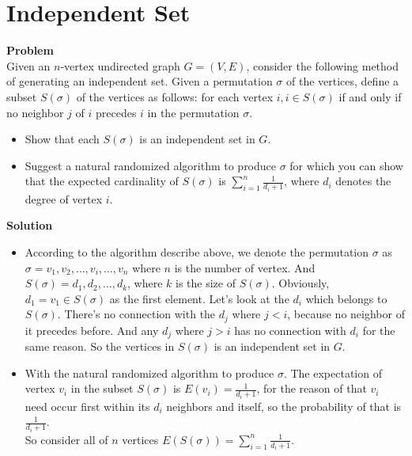 	\section{Independent Set}
	\textbf{Problem}\\
	Given an $n$-vertex undirected graph $G = (V, E)$, consider the following method of generating an independent set. Given a permutation $\sigma$ of the vertices, define a subset $S(\sigma)$ of the vertices as follows: for each vertex $i, i \in S(\sigma)$ if and only if no neighbor $j$ of $i$ precedes $i$ in the permutation $\sigma$.
	
	\begin{itemize}
		\item Show that each $S(\sigma)$ is an independent set in $G$.
		\item Suggest a natural randomized algorithm to produce $\sigma$ for which you can show that the expected cardinality of $S(\sigma)$ is $\sum_{i=1}^{n} \frac{1}{d_i+1}$, where $d_i$ denotes the degree of vertex $i$.
	\end{itemize}
	\textbf{Solution}\\
	\begin{itemize}
	\item
	According to the algorithm describe above, we denote the permutation $\sigma$ as $\sigma = {v_1, v_2, \dots, v_i, \dots, v_n}$ where $n$ is the number of vertex. And $S(\sigma)={d_1, d_2, \dots, d_k}$, where $k$ is the size of $S(\sigma)$. Obviously, $d_1 = v_1 \in S(\sigma)$ as the first element. Let's look at the $d_i$ which belongs to $S(\sigma)$. There's no connection with the $d_j$ where $j<i$, because no neighbor of it precedes before. And any $d_j$ where $j>i$ has no connection with $d_i$ for the same reason. So the vertices in $S(\sigma)$ is an independent set in $G$.
	
	\item
	With the natural randomized algorithm to produce $\sigma$. The expectation of vertex $v_i$ in the subset $S(\sigma)$ is $E(v_i) = \frac{1}{d_i+1}$, for the reason of that $v_i$ need occur first within its $d_i$ neighbors and itself, so the probability of that is $\frac{1}{d_i+1}$.\\
	So consider all of $n$ vertices $E(S(\sigma)) = \sum_{i=1}^{n} \frac{1}{d_i+1}$.
	\end{itemize}
	
